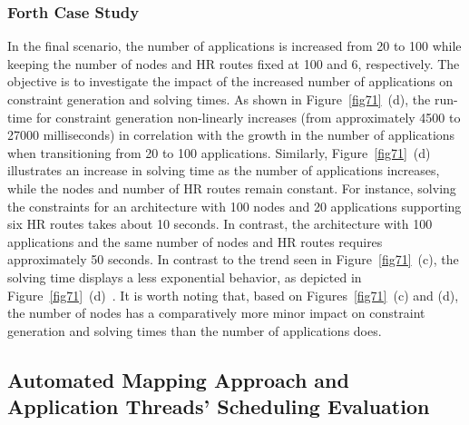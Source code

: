     \subsubsection{Forth Case Study}
     In the final scenario, the number of applications is increased from 20 to 100 while keeping the number of nodes and HR routes fixed at 100 and 6, respectively. The objective is to investigate the impact of the increased number of applications on constraint generation and solving times. As shown in Figure~\ref{fig71}~(d), the run-time for constraint generation non-linearly increases (from approximately 4500 to 27000 milliseconds) in correlation with the growth in the number of applications when transitioning from 20 to 100 applications. Similarly, Figure~\ref{fig71}~(d) illustrates an increase in solving time as the number of applications increases, while the nodes and number of HR routes remain constant.
    For instance, solving the constraints for an architecture with 100 nodes and 20 applications supporting six HR routes takes about 10 seconds. In contrast, the architecture with 100 applications and the same number of nodes and HR routes requires approximately 50 seconds. In contrast to the trend seen in Figure~\ref{fig71}~(c), the solving time displays a less exponential behavior, as depicted in Figure~\ref{fig71}~(d)~\cite{9565115}.
    It is worth noting that, based on Figures~\ref{fig71}~(c) and (d), the number of nodes has a comparatively more minor impact on constraint generation and solving times than the number of applications does.
 
        
        
        
        
     \subsection{Automated Mapping Approach and Application Threads' Scheduling Evaluation}
    

